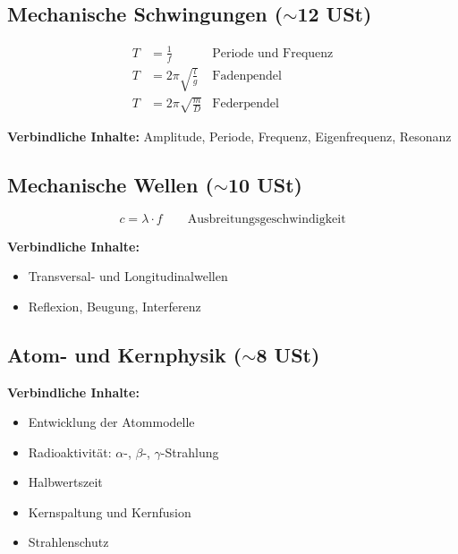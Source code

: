 \documentclass[11pt,a4paper]{article}
\begin{document}
\subsection{Mechanische Schwingungen ($\sim$12 USt)}

\begin{formelbox}
\begin{align*}
T &= \frac{1}{f} & \text{Periode und Frequenz} \\
T &= 2\pi \sqrt{\frac{l}{g}} & \text{Fadenpendel} \\
T &= 2\pi \sqrt{\frac{m}{D}} & \text{Federpendel}
\end{align*}
\end{formelbox}

\textbf{Verbindliche Inhalte:} Amplitude, Periode, Frequenz, Eigenfrequenz, Resonanz

\subsection{Mechanische Wellen ($\sim$10 USt)}

\begin{formelbox}
\[
c = \lambda \cdot f \qquad \text{Ausbreitungsgeschwindigkeit}
\]
\end{formelbox}

\textbf{Verbindliche Inhalte:}
\begin{itemize}[leftmargin=0.5cm, itemsep=1pt]
\item Transversal- und Longitudinalwellen
\item Reflexion, Beugung, Interferenz
\end{itemize}

\subsection{Atom- und Kernphysik ($\sim$8 USt)}

\textbf{Verbindliche Inhalte:}
\begin{itemize}[leftmargin=0.5cm, itemsep=1pt]
\item Entwicklung der Atommodelle
\item Radioaktivität: $\alpha$-, $\beta$-, $\gamma$-Strahlung
\item Halbwertszeit
\item Kernspaltung und Kernfusion
\item Strahlenschutz
\end{itemize}

\newpage
\end{document}
